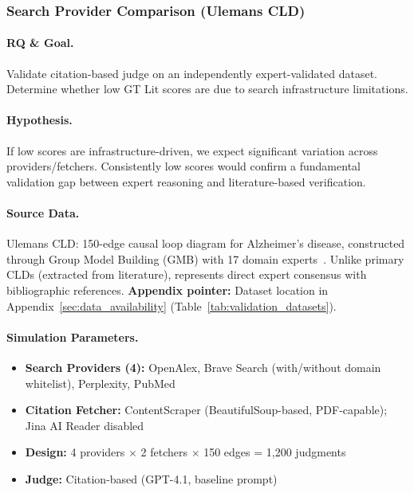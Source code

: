 \subsubsection{Search Provider Comparison (Ulemans CLD)}
\label{sec:ulemans_validation}

\paragraph{RQ \& Goal.}
Validate citation-based judge on an independently expert-validated dataset. Determine whether low GT Lit scores are due to search infrastructure limitations.

\paragraph{Hypothesis.}
If low scores are infrastructure-driven, we expect significant variation across providers/fetchers. Consistently low scores would confirm a fundamental validation gap between expert reasoning and literature-based verification.

\paragraph{Source Data.}
Ulemans CLD: 150-edge causal loop diagram for Alzheimer's disease, constructed through Group Model Building (GMB) with 17 domain experts~\cite{uleman2024triangulation}. Unlike primary CLDs (extracted from literature), represents direct expert consensus with bibliographic references.
\textbf{Appendix pointer:} Dataset location in Appendix~\ref{sec:data_availability} (Table~\ref{tab:validation_datasets}).

\paragraph{Simulation Parameters.}
\begin{itemize}[noitemsep]
    \item \textbf{Search Providers (4):} OpenAlex, Brave Search (with/without domain whitelist), Perplexity, PubMed
    \item \textbf{Citation Fetcher:} ContentScraper (BeautifulSoup-based, PDF-capable); Jina AI Reader disabled
    \item \textbf{Design:} 4 providers $\times$ 2 fetchers $\times$ 150 edges = 1,200 judgments
    \item \textbf{Judge:} Citation-based (GPT-4.1, baseline prompt)
\end{itemize}

